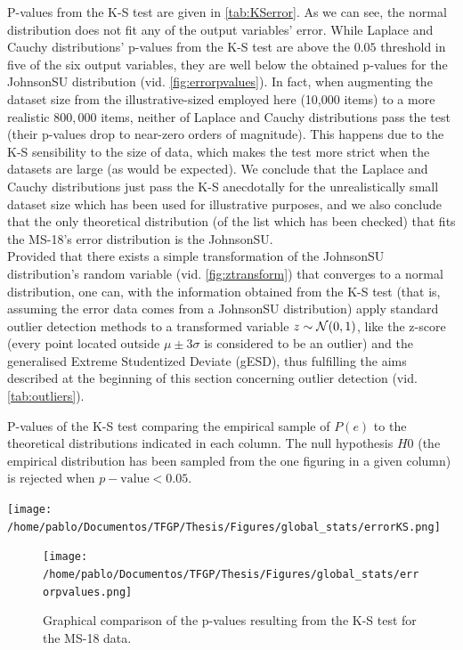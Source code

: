 %
\indent P-values from the K-S test are given in \autoref{tab:KSerror}. As we can see, the normal distribution does not fit any of the output variables' error. While Laplace and Cauchy distributions' p-values from the K-S test are above the $0.05$ threshold in five of the six output variables, they are well below the obtained p-values for the JohnsonSU\cite{jones2009sinh} distribution (vid. \autoref{fig:errorpvalues}). In fact, when augmenting the dataset size from the illustrative-sized employed here (10,000 items) to a more realistic $800,000$ items, neither of Laplace and Cauchy distributions pass the test (their p-values drop to near-zero orders of magnitude). This happens due to the K-S sensibility to the size of data, which makes the test more strict when the datasets are large (as would be expected). We conclude that the Laplace and Cauchy distributions just pass the K-S anecdotally for the unrealistically small dataset size which has been used for illustrative purposes, and we also conclude that the only theoretical distribution (of the list which has been checked) that fits the MS-18's error distribution is the JohnsonSU.\\
%
\indent Provided that there exists a simple transformation of the JohnsonSU distribution's random variable (vid. \autoref{fig:ztransform}) that converges to a normal distribution, one can, with the information obtained from the K-S test (that is, assuming the error data comes from a JohnsonSU distribution) apply standard outlier detection methods to a transformed variable $z\sim {\cal{N}}(0,1)$, like the z-score (every point located outside $\mu\pm 3\sigma$ is considered to be an outlier) and the generalised Extreme Studentized Deviate\cite{rosner1983percentage} (gESD), thus fulfilling the aims described at the beginning of this section concerning outlier detection (vid. \autoref{tab:outliers}).\\
\begin{table}[!htb]
	\centering
	\caption{P-values of the K-S test comparing the empirical sample of $P(e)$ to the theoretical distributions indicated in each column. The null hypothesis $H0$ (the empirical distribution has been sampled from the one figuring in a given column) is rejected when $p-\text{value}<0.05$.}
	\texttt{[image: /home/pablo/Documentos/TFGP/Thesis/Figures/global\_stats/errorKS.png]}
	\label{tab:KSerror}
\end{table}
\begin{figure}[!htb]
	\centering
	\texttt{[image: /home/pablo/Documentos/TFGP/Thesis/Figures/global\_stats/errorpvalues.png]}
	\caption{Graphical comparison of the p-values resulting from the K-S test for the MS-18 data.}
	\label{fig:errorpvalues}
\end{figure}
